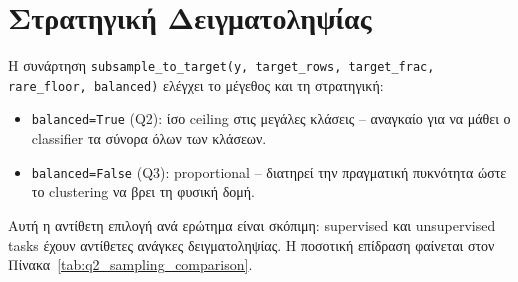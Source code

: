 \documentclass[12pt,a4paper,twoside]{book}
\begin{document}
\section{Στρατηγική Δειγματοληψίας}

Η συνάρτηση \texttt{subsample\_to\_target(y, target\_rows, target\_frac,
rare\_floor, balanced)} ελέγχει το μέγεθος και τη στρατηγική:
\begin{itemize}
    \item \texttt{balanced=True} (Q2): ίσο ceiling στις μεγάλες κλάσεις --
    αναγκαίο για να μάθει ο classifier τα σύνορα όλων των κλάσεων.
    \item \texttt{balanced=False} (Q3): proportional -- διατηρεί την
    πραγματική πυκνότητα ώστε το clustering να βρει τη φυσική δομή.
\end{itemize}
Αυτή η αντίθετη επιλογή ανά ερώτημα είναι σκόπιμη: supervised και
unsupervised tasks έχουν αντίθετες ανάγκες δειγματοληψίας. Η ποσοτική
επίδραση φαίνεται στον Πίνακα~\ref{tab:q2_sampling_comparison}.
\end{document}
